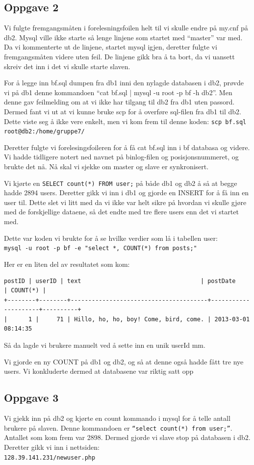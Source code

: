 \documentclass[a4paper, norsk, 12pt]{article}
\begin{document}
\subsection{Oppgave 2}
Vi fulgte fremgangsmåten i forelesningsfoilen helt til vi skulle endre på my.cnf på db2. Mysql ville ikke starte så lenge linjene som startet med “master” var med. Da vi kommenterte ut de linjene, startet mysql igjen, deretter fulgte vi fremgangsmåten videre uten feil. De linjene gikk bra å ta bort, da vi uansett skreiv det inn i det vi skulle starte slaven.

For å legge inn bf.sql dumpen fra db1 inni den nylagde databasen i db2, prøvde vi på db1 denne kommandoen “cat bf.sql | mysql -u root -p bf -h db2”. Men denne gav feilmelding om at vi ikke har tilgang til db2 fra db1 uten passord. Dermed fant vi ut at vi kunne bruke scp for å overføre sql-filen fra db1 til db2. Dette viste seg å ikke vere enkelt, men vi kom frem til denne koden:
\verb|scp bf.sql root@db2:/home/gruppe7/|

Deretter fulgte vi forelesingsfoileren for å få cat bf.sql inn i bf databasa og videre. Vi hadde tidligere notert ned navnet på binlog-filen og posisjonsnummeret, og brukte det nå. Nå skal vi sjekke om master og slave er synkronisert.

Vi kjørte en \verb|SELECT count(*) FROM user;| på både db1 og db2 å så at begge hadde 2894 users. Deretter gikk vi inn i db1 og gjorde en INSERT for å få inn en user til. Dette slet vi litt med da vi ikke var helt sikre på hvordan vi skulle gjøre med de forskjellige dataene, så det endte med tre flere users enn det vi startet med.

Dette var koden vi brukte for å se hvilke verdier som lå i tabellen user:\\
\verb|mysql -u root -p bf -e "select *, COUNT(*) from posts;"|

Her er en liten del av resultatet som kom:
\begin{verbatim}
postID | userID | text                                  | postDate            | COUNT(*) |
+--------+--------+---------------------------------------+---------------------+----------+
|      1 |     71 | Hillo, ho, ho, boy! Come, bird, come. | 2013-03-01 08:14:35
\end{verbatim}
Så da lagde vi brukere manuelt ved å sette inn en unik userId mm.

Vi gjorde en ny COUNT på db1 og db2, og så at denne også hadde fått tre nye users. Vi konkluderte dermed at databasene var riktig satt opp
\subsection{Oppgave 3}
Vi gjekk inn på db2 og kjørte en count kommando i mysql for å telle antall brukere på slaven. Denne kommandoen er \verb|“select count(*) from user;”|. Antallet som kom frem var 2898. Dermed gjorde vi slave stop på databasen i db2. Deretter gikk vi inn i nettsiden:\\
\verb|128.39.141.231/newuser.php|
\end{document}
